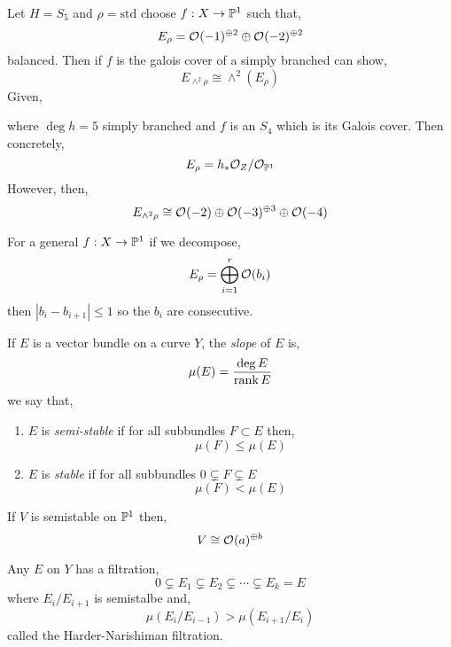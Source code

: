 \documentclass[12pt]{article}
\begin{document}
\begin{example}
Let $H = S_5$ and $\rho = \text{std}$ choose $f : X \to \P^1$ such that,
\[ E_\rho = \struct{}(-1)^{\oplus 2} \oplus \struct{}(-2)^{\oplus 2} \]
balanced. Then if $f$ is the galois cover of a simply branched can show,
\[ E_{\wedge^2 \rho} \cong \wedge^2 (E_\rho) \]
Given,
\begin{center}
\end{center}
where $\deg{h} = 5$ simply branched and $f$ is an $S_4$ which is its Galois cover. Then concretely,
\[ E_\rho = h_* \struct{Z} / \struct{\P^1} \]
However, then,
\[ E_{\wedge^2 \rho} \cong \struct{}(-2) \oplus \struct{}(-3)^{\oplus 3} \oplus \struct{}(-4) \]
\end{example}

\begin{theorem}[L-Litt]
For a general $f : X \to \P^1$ if we decompose,
\[ E_\rho = \bigoplus_{i = 1}^r \struct{}(b_i) \]
then $|b_i - b_{i+1}| \le 1$ so the $b_i$ are consecutive. 
\end{theorem}

\begin{defn}
If $E$ is a vector bundle on a curve $Y$, the \textit{slope} of $E$ is,
\[ \mu(E) = \frac{\deg{E}}{\rank{E}} \]
we say that,
\begin{enumerate}
\item $E$ is \textit{semi-stable} if for all subbundles $F \subset E$ then,
\[ \mu(F) \le \mu(E) \]
\item $E$ is \textit{stable} if for all subbundles $0 \subsetneq F \subsetneq E$
\[ \mu(F) < \mu(E) \] 
\end{enumerate}
\end{defn}

\begin{example}
If $V$ is semistable on $\P^1$ then,
\[ V \cong \struct{}(a)^{\oplus b} \]
\end{example}

\begin{theorem}
Any $E$ on $Y$ has a filtration,
\[ 0 \subsetneq E_1 \subsetneq E_2 \subsetneq \cdots \subsetneq E_k = E \]
where $E_i / E_{i+1}$ is semistalbe and,
\[ \mu(E_i / E_{i-1}) > \mu(E_{i+1} / E_i) \]
called the Harder-Narishiman filtration.
\end{theorem}
\end{document}
